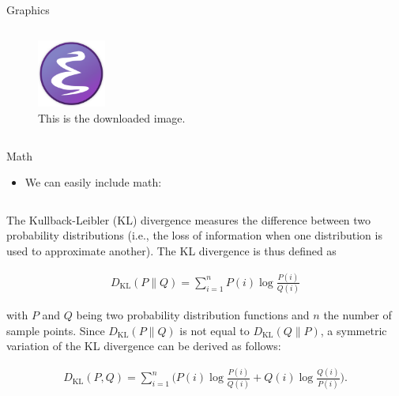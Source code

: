 \documentclass[final]{beamer}
\newcommand\sumin{\sum_{i=1}^{n}}
\newcommand{\Xoi}[1]{#1(i)}
\newcommand{\frakPQ}[2]{\frac{\Xoi{#1}}{\Xoi{#2}}}
\newcommand{\DKLPQ}[3]{D_{\mathrm{KL}}(#1 #3 #2)}
\begin{document}
\begin{frame}[fragile,label={sec:org727f6f5}]{}
\begin{columns}
\begin{column}[t]{0.45\columnwidth}
\begin{block}{Graphics}
\begin{columns}
\begin{column}[T]{0.78\columnwidth}
\vspace{2cm}

\begin{figure}[htbp]
\centering
\includegraphics[page=9,width=0.2\textwidth]{emacs.png}
\caption{\label{fig:orgf35b3ea}
This is the downloaded image.}
\end{figure}
\end{column}
\end{columns}
\end{block}

\begin{block}{Math}
\begin{itemize}
\item We can easily include math:
\end{itemize}

\begin{columns}
\begin{column}[T]{0.78\columnwidth}
The Kullback-Leibler (KL) divergence measures the difference between two
probability distributions (i.e., the loss of information when one
distribution is used to approximate another). The KL divergence is thus
defined as

\begin{align} 
\label{eq:KL} 
\DKLPQ{P}{Q}{\|} = \sumin \Xoi{P} \log \frakPQ{P}{Q}
\end{align} 

with \(P\) and \(Q\) being two probability distribution functions and \(n\)
the number of sample points. Since \(\DKLPQ{P}{Q}{\|}\) is not equal to
\(\DKLPQ{Q}{P}{\|}\), a symmetric variation of the KL divergence can be
derived as follows:

\begin{align} 
\label{eq:KL2} 
\DKLPQ{P}{Q}{,} = \sumin \Big(\Xoi{P} \log \frakPQ{P}{Q} + \Xoi{Q} \log \frakPQ{Q}{P} \Big).
\end{align}
\end{column}
\end{columns}
\end{block}


\end{column}
\end{columns}
\end{frame}
\end{document}
